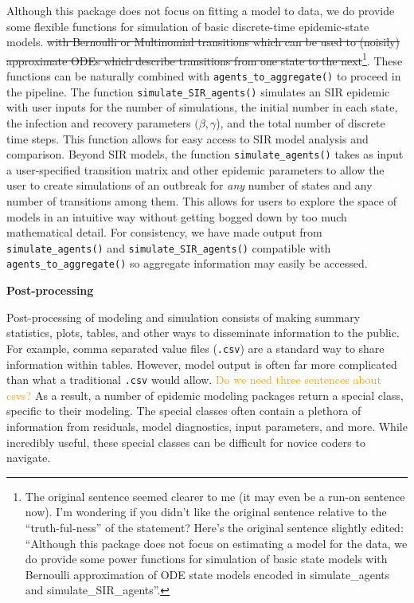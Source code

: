 \documentclass[
  shortnames]{jss}
\begin{document}
Although this package does not focus on fitting a model to data, we do
provide some flexible functions for simulation of basic discrete-time
epidemic-state
models.\sout{ with Bernoulli or Multinomial transitions which can be used to (noisily) approximate ODEs which describe transitions from one state to the next}\footnote{The
  original sentence seemed clearer to me (it may even be a run-on
  sentence now). I'm wondering if you didn't like the original sentence
  relative to the ``truth-ful-ness'' of the statement? Here's the
  original sentence slightly edited: ``Although this package does not
  focus on estimating a model for the data, we do provide some power
  functions for simulation of basic state models with Bernoulli
  approximation of ODE state models encoded in simulate\_agents and
  simulate\_SIR\_agents''.}. These functions can be naturally combined
with \texttt{agents\_to\_aggregate()} to proceed in the pipeline. The
function \texttt{simulate\_SIR\_agents()} simulates an SIR epidemic with
user inputs for the number of simulations, the initial number in each
state, the infection and recovery parameters \((\beta, \gamma\)), and
the total number of discrete time steps. This function allows for easy
access to SIR model analysis and comparison. Beyond SIR models, the
function \texttt{simulate\_agents()} takes as input a user-specified
transition matrix and other epidemic parameters to allow the user to
create simulations of an outbreak for \textit{any} number of states and
any number of transitions among them. This allows for users to explore
the space of models in an intuitive way without getting bogged down by
too much mathematical detail. For consistency, we have made output from
\texttt{simulate\_agents()} and \texttt{simulate\_SIR\_agents()}
compatible with \texttt{agents\_to\_aggregate()} so aggregate
information may easily be accessed.

\textbf{Post-processing}

Post-processing of modeling and simulation consists of making summary
statistics, plots, tables, and other ways to disseminate information to
the public. For example, comma separated value files (\texttt{.csv}) are
a standard way to share information within tables. However, model output
is often far more complicated than what a traditional \texttt{.csv}
would allow. \textcolor{orange}{Do we need three sentences about csvs?}
As a result, a number of epidemic modeling packages return a special
class, specific to their modeling. The special classes often contain a
plethora of information from residuals, model diagnostics, input
parameters, and more. While incredibly useful, these special classes can
be difficult for novice coders to navigate.
\end{document}

